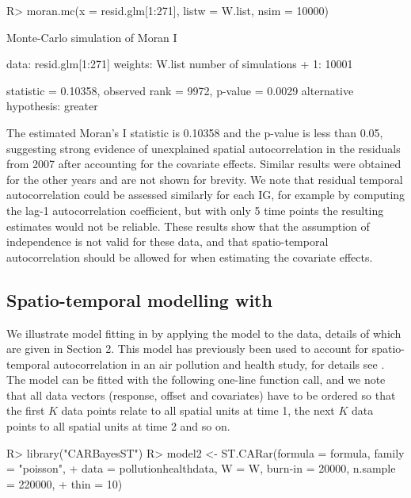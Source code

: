 \documentclass[article, nojss]{jss}
\begin{document}
\begin{Schunk}
\begin{Sinput}
R> moran.mc(x = resid.glm[1:271], listw = W.list, nsim = 10000)
\end{Sinput}
\begin{Soutput}
	Monte-Carlo simulation of Moran I

data:  resid.glm[1:271] 
weights: W.list  
number of simulations + 1: 10001 

statistic = 0.10358, observed rank = 9972, p-value = 0.0029
alternative hypothesis: greater
\end{Soutput}
\end{Schunk}

The estimated Moran's I statistic is 0.10358 and the p-value is less than 0.05, suggesting strong evidence of unexplained spatial autocorrelation in the residuals from 2007 after accounting for the covariate effects. Similar results were obtained for the other years and are not shown for brevity. We note that residual temporal autocorrelation could be assessed similarly for each IG, for example by computing the lag-1 autocorrelation coefficient, but with only 5 time points the resulting estimates would not be reliable. These results show that the assumption of independence is not valid for these data, and that spatio-temporal autocorrelation should be allowed for when estimating the covariate effects. 


\subsection[Spatio-temporal modelling with CARBayesST]{Spatio-temporal modelling with }
We illustrate model fitting in  by applying the  model to the data, details of which are given in Section 2. This model has previously been used to account for spatio-temporal autocorrelation in an air pollution and health study, for details see \cite{rushworth2014}. The model can be fitted with the following one-line function call, and we note that all data vectors (response, offset and covariates) have to be ordered so that the first $K$ data points relate to all spatial units at time 1, the next $K$ data points to all spatial units at time 2 and so on.


\begin{CodeInput}
R> library("CARBayesST")
R> model2 <- ST.CARar(formula = formula, family = "poisson", 
+    data = pollutionhealthdata, W = W, burn-in = 20000, n.sample = 220000, 
+    thin = 10)
\end{CodeInput}
\end{document}
